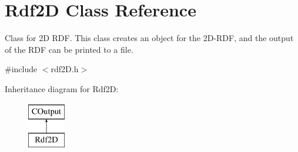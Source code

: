 \hypertarget{classRdf2D}{}\section{Rdf2D Class Reference}
\label{classRdf2D}


Class for 2D R\+DF. This class creates an object for the 2D-\/\+R\+DF, and the output of the R\+DF can be printed to a file.  




{\ttfamily \#include $<$rdf2\+D.\+h$>$}

Inheritance diagram for Rdf2D\+:\begin{figure}[H]
\begin{center}
\leavevmode
\includegraphics[height=2.000000cm]{classRdf2D}
\end{center}
\end{figure}
